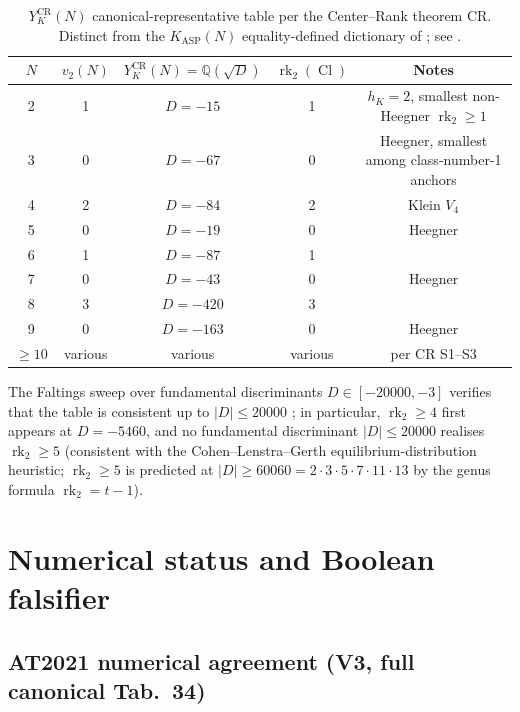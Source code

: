 \documentclass[11pt,a4paper,reqno]{amsart}
\theoremstyle{definition}
\DeclareMathOperator{\Cl}{Cl}
\DeclareMathOperator{\rk}{rk}
\newcommand{\KASP}{K_{\mathrm{ASP}}}
\newcommand{\YKCR}{Y_K^{\mathrm{CR}}}
\newcommand{\QQ}{\mathbb{Q}}
\begin{document}
\begin{table}[ht]
\centering
\begin{tabular}{ccccc}
\toprule
$N$ & $v_2(N)$ & $\YKCR(N) = \QQ(\sqrt{D})$ & $\rk_2(\Cl)$ & Notes \\
\midrule
2 & 1 & $D=-15$ & 1 & $h_K = 2$, smallest non-Heegner $\rk_2\ge 1$ \\
3 & 0 & $D=-67$ & 0 & Heegner, smallest among class-number-1 anchors \\
4 & 2 & $D=-84$ & 2 & Klein $V_4$ \\
5 & 0 & $D=-19$ & 0 & Heegner \\
6 & 1 & $D=-87$ & 1 & \\
7 & 0 & $D=-43$ & 0 & Heegner \\
8 & 3 & $D=-420$ & 3 & \\
9 & 0 & $D=-163$ & 0 & Heegner \\
$\ge 10$ & various & various & various & per CR S1--S3 \\
\bottomrule
\end{tabular}
\caption{$\YKCR(N)$ canonical-representative table per the
Center--Rank theorem CR. Distinct from the $\KASP(N)$
equality-defined dictionary of \cite{Remondiere2026KASPmini}; see
\cite[\S 1.2 Remark 1.1]{Remondiere2026TransportV2}.}\label{tab:KASP}
\end{table}

The Faltings sweep over fundamental discriminants $D\in[-20000,-3]$
verifies that the table is consistent up to $|D|\le 20000$
\cite[Sec.~A]{Remondiere2026FaltingsLLZDigest}; in particular,
$\rk_2 \ge 4$ first appears at $D = -5460$, and no fundamental
discriminant $|D|\le 20000$ realises $\rk_2 \ge 5$ (consistent with
the Cohen--Lenstra--Gerth equilibrium-distribution heuristic;
$\rk_2 \ge 5$ is predicted at $|D|\ge 60060 = 2\cdot 3\cdot 5\cdot 7\cdot
11\cdot 13$ by the genus formula $\rk_2 = t - 1$).

\section{Numerical status and Boolean falsifier}\label{sec:numeric}

\subsection{AT2021 numerical agreement (V3, full canonical Tab.~34)}\label{ss:numeric}
\end{document}
